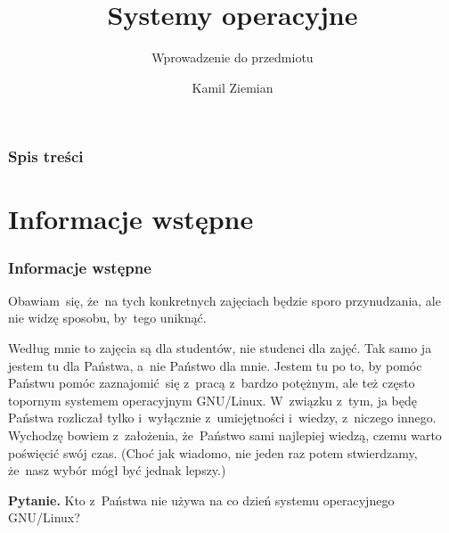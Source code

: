 \documentclass[10pt,t]{beamer}
\title{Systemy operacyjne}
\subtitle{Wprowadzenie do przedmiotu}
\author{Kamil Ziemian \\
  \email}
\begin{document}





\RaggedRight





\maketitle





\begin{frame}
  \frametitle{Spis treści}


  \tableofcontents

\end{frame}





\section{Informacje wstępne}



\begin{frame}
  \frametitle{Informacje wstępne}


  Obawiam~się, że~na tych konkretnych zajęciach będzie sporo przynudzania,
  ale nie widzę sposobu, by~tego uniknąć.

  Według mnie to zajęcia są dla studentów, nie studenci dla zajęć. Tak samo
  ja jestem tu dla Państwa, a~nie Państwo dla mnie. Jestem tu po to, by
  pomóc Państwu pomóc zaznajomić~się z~pracą z~bardzo potężnym, ale też
  często topornym systemem operacyjnym GNU/Linux. W~związku z~tym,
  ja będę Państwa rozliczał tylko i~wyłącznie z~umiejętności i~wiedzy,
  z~niczego innego. Wychodzę bowiem z~założenia, że~Państwo sami najlepiej
  wiedzą, czemu warto poświęcić swój czas. (Choć jak wiadomo, nie jeden raz
  potem stwierdzamy, że~nasz wybór mógł być jednak lepszy.)

  \textbf{Pytanie.} Kto z~Państwa \alert{nie} używa na co dzień systemu
  operacyjnego GNU/Linux?

\end{frame}
\end{document}
